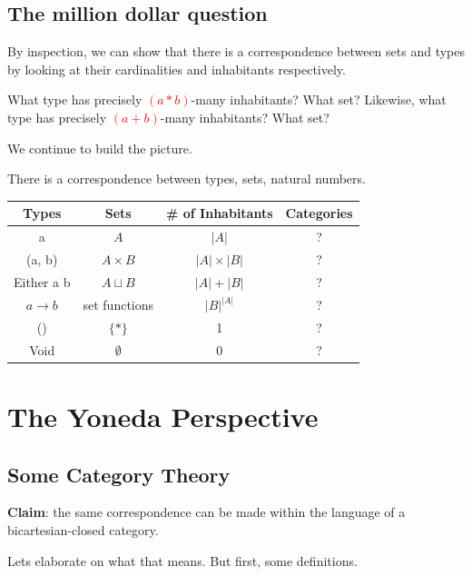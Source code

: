 \documentclass[tikz]{beamer}
\newcommand{\mred}[1]{\textcolor{red}{$#1$}}
\theoremstyle{definition}
\begin{document}
\subsection{The million dollar question}

\frame
{ 
	By inspection, we can show that there is a correspondence between sets and types by looking at their cardinalities and inhabitants respectively. 
}

\frame
{
	What type has precisely \mred{(a * b)}-many inhabitants? What set? Likewise, what type has precisely \mred{(a + b)}-many inhabitants? What set?
}

\frame
{
	We continue to build the picture.
}

\begin{frame}
There is a correspondence between types, sets, natural numbers.
\begin{center}
\begin{tabular}{|c|c|c|c|}
\hline
Types & Sets & \# of Inhabitants & Categories \\
\hline
a       & $A$ & $|A|$  & ? \\
(a, b) & $A \times B$ & $|A| \times |B|$ & ? \\
Either a b & $A \sqcup B$ & $|A| + |B|$ & ? \\
$a \to b$ &  set functions & $|B|^{|A|}$ & ? \\
() & $\{*\}$ & 1 & ? \\
Void & $\emptyset$ & 0 & ? \\ \hline
\end{tabular}
\end{center}
\end{frame}

\section{The Yoneda Perspective}


\subsection{Some Category Theory}

\frame
{
	\textbf{Claim}: the same correspondence can be made within the language of a bicartesian-closed category. 
}

\frame
{
	Lets elaborate on what that means. But first, some definitions.
}
\end{document}
